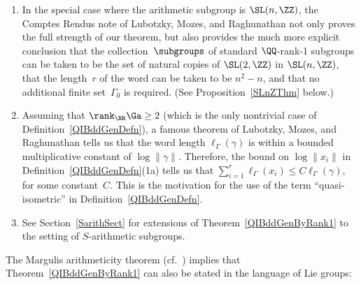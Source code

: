 \begin{rems} \label{MainRems}
\leavevmode
\begin{enumerate}\itemsep=0pt
\item In the special case where the arithmetic subgroup is $\SL(n,\ZZ)$, the Comptes Rendus note of Lubotzky, Mozes, and Raghunathan \cite[Corollary~3]{MR1244421} not only proves the full strength of our theorem, but also provides the much more explicit conclusion that the collection~$\subgroups$ of standard $\QQ$-rank-1 subgroups can be taken to be the set of natural copies of $\SL(2,\ZZ)$ in $\SL(n,\ZZ)$, that the length~$r$ of the word can be taken to be $n^2 - n$, and that no additional finite set~$\Gamma_0$ is required. (See Proposition~\ref{SLnZThm} below.)
	
\item \label{MainRems-wordlength}Assuming that $\rank_\RR \Ga \ge 2$ (which is the only nontrivial case of Definition~\ref{QIBddGenDefn}), a famous theorem of Lubotzky, Mozes, and Raghunathan \cite[Theorem~A]{MR1828742} tells us that the word length $\ell_\Gamma(\gamma)$ is within a bounded multiplicative constant of $\log \| \gamma \|$. Therefore, the bound on $\log \|x_i\|$ in Definition~\ref{QIBddGenDefn}(1a) tells us that $\sum\limits_{i=1}^r \ell_\Gamma(x_i) \le C \ell_\Gamma(\gamma)$, for some constant~$C$. This is the motivation for the use of the term ``quasi-isometric'' in Definition~\ref{QIBddGenDefn}.
\item See Section~\ref{SarithSect} for extensions of Theorem~\ref{QIBddGenByRank1} to the setting of $S$-arithmetic subgroups.
\end{enumerate}
\end{rems}

The Margulis arithmeticity theorem (cf.\ \cite[Theorem~5.2.1, p.~90]{Morris-IntroArithGrps}) implies that Theorem~\ref{QIBddGenByRank1} can also be stated in the language of Lie groups:


